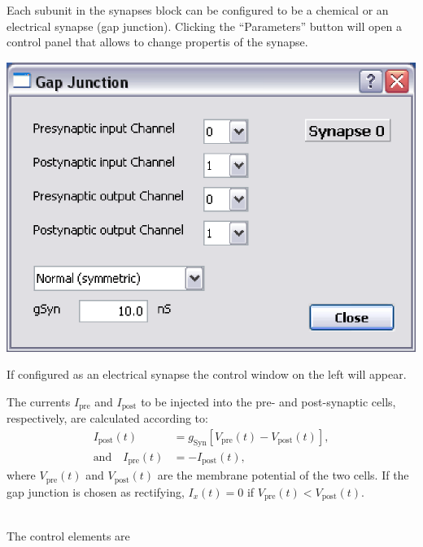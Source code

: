\documentclass{article}
\begin{document}
Each subunit in the synapses block can be configured to be a
chemical or an electrical synapse (gap junction). Clicking the
``Parameters'' button will open a control panel that allows to change
propertis of the synapse. \\

\noindent
\parbox{0.4\textwidth}{
\includegraphics[scale=0.5]{gapJunctionDialog}
}
\hfill
\parbox{0.55\textwidth}{
If configured as an electrical synapse the control window on the left
will appear. 

The currents $I_{\text{pre}}$ and $I_{\text{post}}$ to be injected
into the pre- and post-synaptic cells, respectively, are calculated
according to:
\begin{align}
  I_{\text{post}}(t) &= g_{\text{Syn}} [V_{\text{pre}}(t) - V_{\text{post}}(t)],  \\
  \text{and} \quad I_{\text{pre}}(t) &= -I_{\text{post}}(t), 
\end{align}
where $V_{\text{pre}}(t)$ and $V_{\text{post}}(t)$ are the membrane
potential of the two cells. If the gap junction is chosen as
rectifying, $I_x (t)= 0$ if $V_{\text{pre}}(t) < V_{\text{post}}(t)$.
} \\[0.2cm]
 The control elements are
\end{document}
